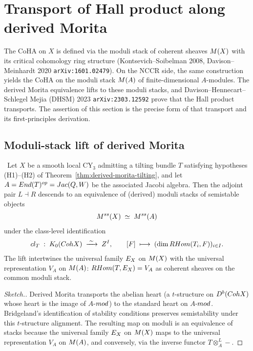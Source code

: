 \section{Transport of Hall product along derived Morita}
\label{sec:hall-transport}

The CoHA on $X$ is defined via the moduli stack of coherent sheaves
$\cM(X)$ with its critical cohomology ring structure (Kontsevich--Soibelman
2008, Davison--Meinhardt 2020 \texttt{arXiv:1601.02479}). On the NCCR side, the
same construction yields the CoHA on the moduli stack $\cM(A)$ of
finite-dimensional $A$-modules. The derived Morita equivalence lifts to these
moduli stacks, and Davison--Hennecart--Schlegel Mejia (DHSM) 2023
\texttt{arXiv:2303.12592} prove that the Hall product transports. The
assertion of this section is the precise form of that transport and its
first-principles derivation.

\subsection*{Moduli-stack lift of derived Morita}

\begin{theorem}
\label{thm:moduli-morita}
\ClaimStatusTheorem\ Let $X$ be a smooth local CY$_3$ admitting a tilting
bundle $T$ satisfying hypotheses (H1)--(H2) of
Theorem~\ref{thm:derived-morita-tilting}, and let $A = \End(T)^{\mathrm{op}} = \Jac(Q, W)$
be the associated Jacobi algebra. Then the adjoint pair $L \dashv R$ descends
to an equivalence of (derived) moduli stacks of semistable objects
\[
  \cM^{\mathrm{ss}}(X) \;\simeq\; \cM^{\mathrm{ss}}(A)
\]
under the class-level identification
\[
  \mathrm{cl}_T \;:\; K_0(\Coh X) \;\xrightarrow{\;\sim\;}\; \Z^{I}, \qquad
  [\cF] \;\longmapsto\; (\dim \RHom(T_i, \cF))_{i \in I}.
\]
The lift intertwines the universal family $\cE_X$ on $\cM(X)$ with the
universal representation $V_A$ on $\cM(A)$: $\RHom(T, \cE_X) = V_A$ as
coherent sheaves on the common moduli stack.
\end{theorem}

\begin{proof}[Sketch.]
Derived Morita transports the abelian heart (a $t$-structure on $D^b(\Coh X)$
whose heart is the image of $A$-$\mod$) to the standard heart on $A$-$\mod$.
Bridgeland's identification of stability conditions preserves semistability
under this $t$-structure alignment. The resulting map on moduli is an
equivalence of stacks because the universal family $\cE_X$ on $\cM(X)$ maps to
the universal representation $V_A$ on $\cM(A)$, and conversely, via the
inverse functor $T \otimes^L_A -$.
\end{proof}

